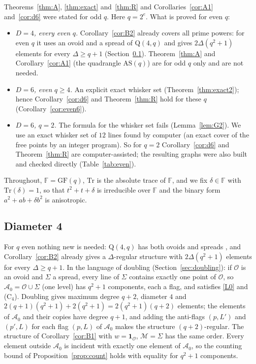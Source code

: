 \documentclass[11pt]{amsart}
\theoremstyle{definition}
\theoremstyle{remark}
\newcommand{\cA}{\mathcal{A}}
\newcommand{\cO}{\mathcal{O}}
\newcommand{\cM}{\mathcal{M}}
\newcommand{\GF}{\mathrm{GF}}
\newcommand{\F}{\mathbb{F}}
\newcommand{\AS}{\mathrm{AS}}
\newcommand{\Qf}{\mathrm{Q}}
\newcommand{\Tr}{\mathrm{Tr}}
\begin{document}
Theorems~\ref{thm:A}, \ref{thm:exact} and~\ref{thm:R} and Corollaries~\ref{cor:A1} and~\ref{cor:d6} were stated for odd $q$. Here $q=2^e$. What is proved for even $q$:
\begin{itemize}[leftmargin=1.5em]
\item \emph{$D=4$, every even $q$.} Corollary~\ref{cor:B2} already covers all prime powers: for even $q$ it uses an ovoid and a spread of $\Qf(4,q)$ and gives $2\Delta(q^2+1)$ elements for every $\Delta\ge q+1$ (Section~\ref{sec:even4}). Theorem~\ref{thm:A} and Corollary~\ref{cor:A1} (the quadrangle $\AS(q)$) are for odd $q$ only and are not needed.
\item \emph{$D=6$, even $q\ge4$.} An explicit exact whisker set (Theorem~\ref{thm:exact2}); hence Corollary~\ref{cor:d6} and Theorem~\ref{thm:R} hold for these $q$ (Corollary~\ref{cor:even6}).
\item \emph{$D=6$, $q=2$.} The formula for the whisker set fails (Lemma~\ref{lem:G2}). We use an exact whisker set of $12$ lines found by computer (an exact cover of the free points by an integer program). So for $q=2$ Corollary~\ref{cor:d6} and Theorem~\ref{thm:R} are computer-assisted; the resulting graphs were also built and checked directly (Table~\ref{tab:even}).
\end{itemize}
Throughout, $\F=\GF(q)$, $\Tr$ is the absolute trace of $\F$, and we fix $\delta\in\F$ with $\Tr(\delta)=1$, so that $t^2+t+\delta$ is irreducible over $\F$ and the binary form $a^2+ab+\delta b^2$ is anisotropic.

\subsection{Diameter 4}\label{sec:even4}
For $q$ even nothing new is needed: $\Qf(4,q)$ has both ovoids and spreads \cite[Ch.~3]{PT}, and Corollary~\ref{cor:B2} already gives a $\Delta$-regular structure with $2\Delta(q^2+1)$ elements for every $\Delta\ge q+1$. In the language of doubling (Section~\ref{sec:doubling}): if $\cO$ is an ovoid and $\Sigma$ a spread, every line of $\Sigma$ contains exactly one point of $\cO$, so $\cA_0=\cO\cup\Sigma$ (one level) has $q^2+1$ components, each a flag, and satisfies \ref{L0} and \textup{(C$_4$)}. Doubling gives maximum degree $q+2$, diameter $4$ and $2(q+1)(q^2+1)+2(q^2+1)=2(q^2+1)(q+2)$ elements; the elements of $\cA_0$ and their copies have degree $q+1$, and adding the anti-flags $(p,L')$ and $(p',L)$ for each flag $(p,L)$ of $\cA_0$ makes the structure $(q+2)$-regular. The structure of Corollary~\ref{cor:B1} with $w=\mathbf 1_\cO$, $\cM=\Sigma$ has the same order. Every element outside $\cA_0$ is incident with exactly one element of $\cA_0$, so the counting bound of Proposition~\ref{prop:count} holds with equality for $q^2+1$ components.
\end{document}
